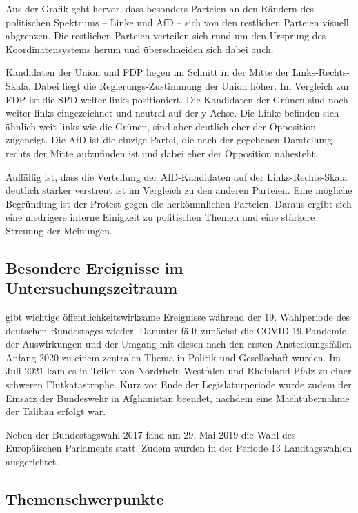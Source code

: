 Aus der Grafik geht hervor, dass besonders Parteien an den Rändern des politischen Spektrums -- Linke und \ac{AfD} -- sich von den restlichen Parteien visuell abgrenzen. Die restlichen Parteien verteilen sich rund um den Ursprung des Koordinatensystems herum und überschneiden sich dabei auch.

Kandidaten der Union und \ac{FDP} liegen im Schnitt in der Mitte der Links-Rechts-Skala. Dabei liegt die Regierungs-Zustimmung der Union höher. Im Vergleich zur \ac{FDP} ist die \ac{SPD} weiter links positioniert. Die Kandidaten der Grünen sind noch weiter links eingezeichnet und neutral auf der y-Achse. Die Linke befinden sich ähnlich weit links wie die Grünen, sind aber deutlich eher der Opposition zugeneigt. Die \ac{AfD} ist die einzige Partei, die nach der gegebenen Darstellung rechts der Mitte aufzufinden ist und dabei eher der Opposition nahesteht.

Auffällig ist, dass die Verteilung der \ac{AfD}-Kandidaten auf der Links-Rechts-Skala deutlich stärker verstreut ist im Vergleich zu den anderen Parteien. Eine mögliche Begründung ist der Protest gegen die herkömmlichen Parteien. Daraus ergibt sich eine niedrigere interne Einigkeit zu politischen Themen und eine stärkere Streuung der Meinungen.

\subsection{Besondere Ereignisse im Untersuchungszeitraum} \label{subsec:besondereEreignisse}

\textcite{schmid_deutscher_2021} gibt wichtige öffentlichkeitswirksame Ereignisse während der \num{19}. Wahlperiode des deutschen Bundestages wieder. Darunter fällt zunächst die \ac{COVID-19}-Pandemie, der Auswirkungen und der Umgang mit diesen nach den ersten Ansteckungsfällen Anfang 2020 zu einem zentralen Thema in Politik und Gesellschaft wurden. Im Juli 2021 kam es in Teilen von Nordrhein-Westfalen und Rheinland-Pfalz zu einer schweren Flutkatastrophe. Kurz vor Ende der Legislaturperiode wurde zudem der Einsatz der Bundeswehr in Afghanistan beendet, nachdem eine Machtübernahme der Taliban erfolgt war.

Neben der Bundestagswahl \num{2017} fand am 29. Mai 2019 die Wahl des Europäischen Parlaments statt. Zudem wurden in der Periode \num{13} Landtagswahlen ausgerichtet.

\subsection{Themenschwerpunkte} \label{subsec:themenschwerpunkte}

